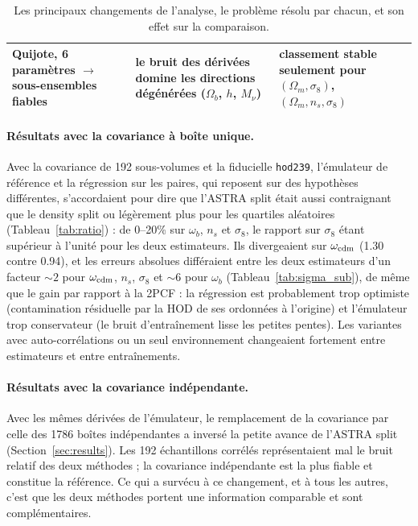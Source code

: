 \documentclass[11pt,twocolumn]{article}
\begin{document}
\begin{table}[!tp]
\begin{tabular}{p{4.2cm}p{6.3cm}p{6.3cm}}
Quijote, 6 paramètres $\to$ sous-ensembles fiables & le bruit des dérivées domine les directions dégénérées ($\Omega_b$, $h$, $M_\nu$) & classement stable seulement pour $(\Omega_m,\sigma_8)$, $(\Omega_m,n_s,\sigma_8)$ \\
\bottomrule
\end{tabular}
\caption{Les principaux changements de l'analyse, le problème résolu par chacun, et son effet sur la comparaison.}
\label{tab:evolution}
\end{table}

\paragraph{Résultats avec la covariance à boîte unique.} Avec la covariance de 192 sous-volumes et la fiducielle \texttt{hod239}, l'émulateur de référence et la régression sur les paires, qui reposent sur des hypothèses différentes, s'accordaient pour dire que l'ASTRA split était aussi contraignant que le density split ou légèrement plus pour les quartiles aléatoires (Tableau~\ref{tab:ratio}) : de 0--20\% sur $\omega_b$, $n_s$ et $\sigma_8$, le rapport sur $\sigma_8$ étant supérieur à l'unité pour les deux estimateurs. Ils divergeaient sur $\omega_{\rm cdm}$ (1.30 contre 0.94), et les erreurs absolues différaient entre les deux estimateurs d'un facteur $\sim2$ pour $\omega_{\rm cdm}$, $n_s$, $\sigma_8$ et $\sim6$ pour $\omega_b$ (Tableau~\ref{tab:sigma_sub}), de même que le gain par rapport à la 2PCF : la régression est probablement trop optimiste (contamination résiduelle par la HOD de ses ordonnées à l'origine) et l'émulateur trop conservateur (le bruit d'entraînement lisse les petites pentes). Les variantes avec auto-corrélations ou un seul environnement changeaient fortement entre estimateurs et entre entraînements.

\paragraph{Résultats avec la covariance indépendante.} Avec les mêmes dérivées de l'émulateur, le remplacement de la covariance par celle des 1786 boîtes indépendantes a inversé la petite avance de l'ASTRA split (Section~\ref{sec:results}). Les 192 échantillons corrélés représentaient mal le bruit relatif des deux méthodes ; la covariance indépendante est la plus fiable et constitue la référence. Ce qui a survécu à ce changement, et à tous les autres, c'est que les deux méthodes portent une information comparable et sont complémentaires.
\end{document}
